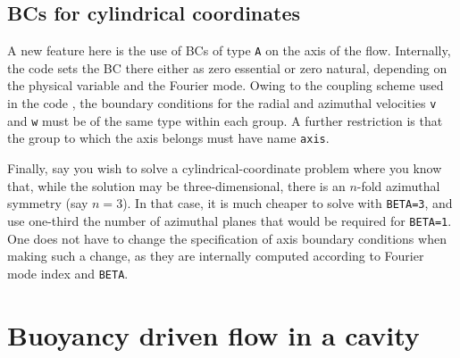 \documentclass[11pt]{report}
\newcommand\threed{three-di\-men\-sion\-al}
\begin{document}
\subsection{BCs for cylindrical coordinates}
\label{sec.cbcs}

A new feature here is the use of BCs of type \verb+A+ on the axis of
the flow.  Internally, the code sets the BC there either as zero
essential or zero natural, depending on the physical variable and the
Fourier mode.  Owing to the coupling scheme used in the code
\citep{blsh04}, the boundary conditions for the radial and azimuthal
velocities \verb+v+ and \verb+w+ must be of the same type within each
group.  A further restriction is that the group to which the axis
belongs must have name \verb+axis+.

Finally, say you wish to solve a cylindrical-coordinate problem where
you know that, while the solution may be \threed, there is an $n$-fold
azimuthal symmetry (say $n=3$). In that case, it is much cheaper to
solve with \verb+BETA=3+, and use one-third the number of azimuthal
planes that would be required for \verb+BETA=1+.  One does not have to
change the specification of axis boundary conditions when making such
a change, as they are internally computed according to Fourier mode
index and \verb|BETA|.

\section{Buoyancy driven flow in a cavity}
\label{sec.tdrivcav}
\end{document}

